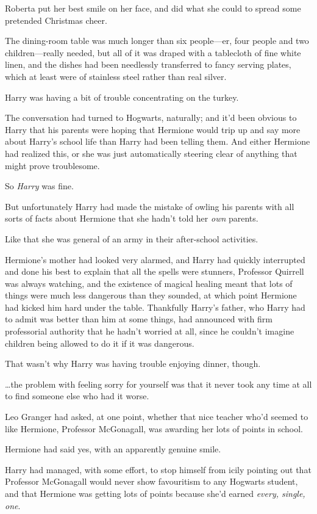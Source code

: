 Roberta put her best smile on her face, and did what she could to spread some pretended Christmas cheer.

\later

The dining-room table was much longer than six people—er, four people and two children—really needed, but all of it was draped with a tablecloth of fine white linen, and the dishes had been needlessly transferred to fancy serving plates, which at least were of stainless steel rather than real silver.

Harry was having a bit of trouble concentrating on the turkey.

The conversation had turned to Hogwarts, naturally; and it’d been obvious to Harry that his parents were hoping that Hermione would trip up and say more about Harry’s school life than Harry had been telling them. And either Hermione had realized this, or she was just automatically steering clear of anything that might prove troublesome.

So \emph{Harry} was fine.

But unfortunately Harry had made the mistake of owling his parents with all sorts of facts about Hermione that she hadn’t told her \emph{own} parents.

Like that she was general of an army in their after-school activities.

Hermione’s mother had looked very alarmed, and Harry had quickly interrupted and done his best to explain that all the spells were stunners, Professor Quirrell was always watching, and the existence of magical healing meant that lots of things were much less dangerous than they sounded, at which point Hermione had kicked him hard under the table. Thankfully Harry’s father, who Harry had to admit was better than him at some things, had announced with firm professorial authority that he hadn’t worried at all, since he couldn’t imagine children being allowed to do it if it was dangerous.

That wasn’t why Harry was having trouble enjoying dinner, though.

…the problem with feeling sorry for yourself was that it never took any time at all to find someone else who had it worse.

Leo Granger had asked, at one point, whether that nice teacher who’d seemed to like Hermione, Professor McGonagall, was awarding her lots of points in school.

Hermione had said yes, with an apparently genuine smile.

Harry had managed, with some effort, to stop himself from icily pointing out that Professor McGonagall would never show favouritism to any Hogwarts student, and that Hermione was getting lots of points because she’d earned \emph{every, single, one}.

